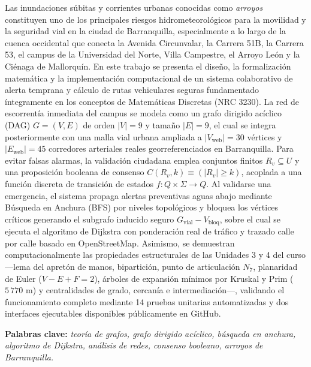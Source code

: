 \documentclass[12pt,letterpaper]{article}
\begin{document}
Las inundaciones súbitas y corrientes urbanas conocidas como \textit{arroyos} constituyen uno de los principales riesgos hidrometeorológicos para la movilidad y la seguridad vial en la ciudad de Barranquilla, especialmente a lo largo de la cuenca occidental que conecta la Avenida Circunvalar, la Carrera 51B, la Carrera 53, el campus de la Universidad del Norte, Villa Campestre, el Arroyo León y la Ciénaga de Mallorquín. En este trabajo se presenta el diseño, la formalización matemática y la implementación computacional de un sistema colaborativo de alerta temprana y cálculo de rutas vehiculares seguras fundamentado íntegramente en los conceptos de Matemáticas Discretas (NRC 3230). La red de escorrentía inmediata del campus se modela como un grafo dirigido acíclico (DAG) $G = (V, E)$ de orden $|V| = 9$ y tamaño $|E| = 9$, el cual se integra posteriormente con una malla vial urbana ampliada a $|V_{\text{web}}| = 30$ vértices y $|E_{\text{web}}| = 45$ corredores arteriales reales georreferenciados en Barranquilla. Para evitar falsas alarmas, la validación ciudadana emplea conjuntos finitos $R_v \subseteq U$ y una proposición booleana de consenso $C(R_v, k) \equiv (|R_v| \ge k)$, acoplada a una función discreta de transición de estados $f: Q \times \Sigma \to Q$. Al validarse una emergencia, el sistema propaga alertas preventivas aguas abajo mediante Búsqueda en Anchura (BFS) por niveles topológicos y bloquea los vértices críticos generando el subgrafo inducido seguro $G_{\text{vial}} - V_{\text{bloq}}$, sobre el cual se ejecuta el algoritmo de Dijkstra con ponderación real de tráfico y trazado calle por calle basado en OpenStreetMap. Asimismo, se demuestran computacionalmente las propiedades estructurales de las Unidades 3 y 4 del curso ---lema del apretón de manos, bipartición, punto de articulación $N_7$, planaridad de Euler ($V - E + F = 2$), árboles de expansión mínimos por Kruskal y Prim ($5\,770\text{ m}$) y centralidades de grado, cercanía e intermediación---, validando el funcionamiento completo mediante 14 pruebas unitarias automatizadas y dos interfaces ejecutables disponibles públicamente en GitHub.

\noindent\textbf{Palabras clave:} \textit{teoría de grafos, grafo dirigido acíclico, búsqueda en anchura, algoritmo de Dijkstra, análisis de redes, consenso booleano, arroyos de Barranquilla.}

\end{document}
